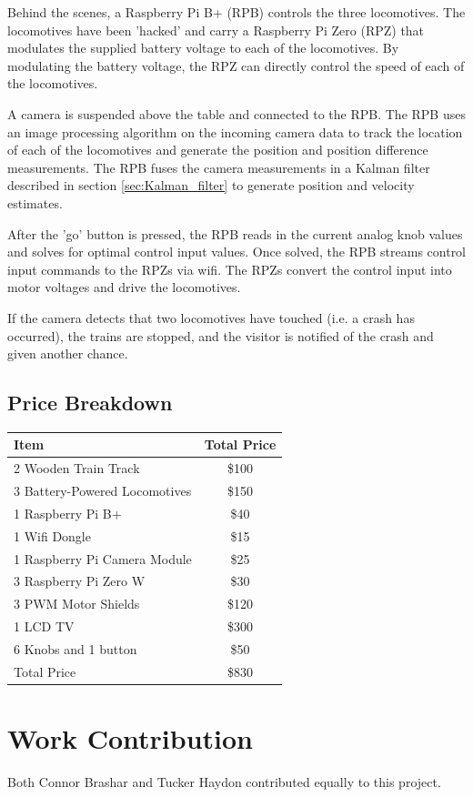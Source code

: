 \documentclass[12pt,onecolumn,reqno]{amsart}
\begin{document}
Behind the scenes, a Raspberry Pi B+ (RPB) controls the three locomotives. The
locomotives have been 'hacked' and carry a Raspberry Pi Zero (RPZ) that
modulates the supplied battery voltage to each of the locomotives. By modulating
the battery voltage, the RPZ can directly control the speed of each of the
locomotives. 

A camera is suspended above the table and connected to the RPB. The RPB uses an
image processing algorithm on the incoming camera data to track the location of
each of the locomotives and generate the position and position difference
measurements. The RPB fuses the camera measurements in a Kalman filter
described in section \ref{sec:Kalman_filter} to generate position and velocity
estimates.

After the 'go' button is pressed, the RPB reads in the current analog knob
values and solves for optimal control input values. Once solved, the
RPB streams control input commands to the RPZs via wifi. The RPZs convert the
control input into motor voltages and drive the locomotives. 

If the camera detects that two locomotives have touched (i.e. a crash has
occurred), the trains are stopped, and the visitor is notified of the crash and
given another chance.


\subsection{Price Breakdown}
\begin{center}
  \begin{tabular} { || l c || }
    \hline
    Item & Total Price \\ [0.5ex] 
    \hline\hline
    2 Wooden Train Track          & \$100 \\
    3 Battery-Powered Locomotives & \$150 \\
    1 Raspberry Pi B+             & \$40  \\
    1 Wifi Dongle                 & \$15  \\
    1 Raspberry Pi Camera Module  & \$25  \\
    3 Raspberry Pi Zero W         & \$30  \\
    3 PWM Motor Shields           & \$120  \\
    1 LCD TV                      & \$300 \\ 
    6 Knobs and 1 button          & \$50  \\
    \hline
    Total Price                   & \$830 \\
    \hline
  \end{tabular}
\end{center}

\section{Work Contribution}
Both Connor Brashar and Tucker Haydon contributed equally to this project.




\end{document}
